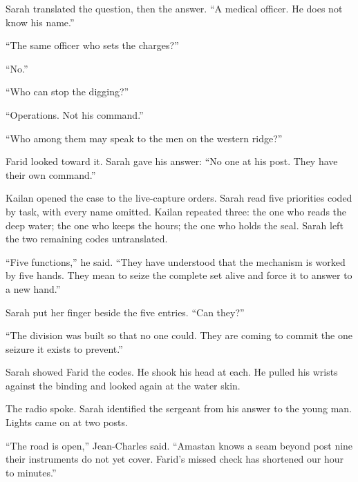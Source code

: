 Sarah translated the question, then the answer. ``A medical officer. He does not know his name.''\par

``The same officer who sets the charges?''\par

``No.''\par

``Who can stop the digging?''\par

``Operations. Not his command.''\par

``Who among them may speak to the men on the western ridge?''\par

Farid looked toward it. Sarah gave his answer: ``No one at his post. They have their own command.''\par

Kailan opened the case to the live-capture orders. Sarah read five priorities coded by task, with every name omitted. Kailan repeated three: the one who reads the deep water; the one who keeps the hours; the one who holds the seal. Sarah left the two remaining codes untranslated.\par

``Five functions,'' he said. ``They have understood that the mechanism is worked by five hands. They mean to seize the complete set alive and force it to answer to a new hand.''\par

Sarah put her finger beside the five entries. ``Can they?''\par

``The division was built so that no one could. They are coming to commit the one seizure it exists to prevent.''\par

Sarah showed Farid the codes. He shook his head at each. He pulled his wrists against the binding and looked again at the water skin.\par

The radio spoke. Sarah identified the sergeant from his answer to the young man. Lights came on at two posts.\par

``The road is open,'' Jean-Charles said. ``Amastan knows a seam beyond post nine their instruments do not yet cover. Farid's missed check has shortened our hour to minutes.''\par

